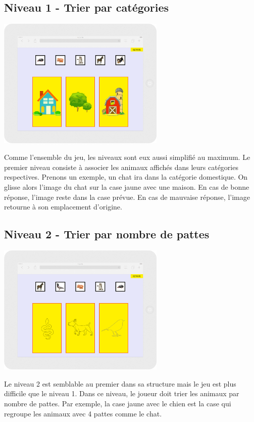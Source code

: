 \documentclass{article}
\begin{document}
\subsection{Niveau 1 - Trier par cat\'egories}
\vspace{0.5cm}
\begin{center}
\includegraphics[width=0.6\textwidth]{page2}
\end{center}
\vspace{0.5cm}
\hspace*{0.6cm}Comme l'ensemble du jeu, les niveaux sont eux aussi simplifi\'e au maximum.
Le premier niveau consiste \`a associer les animaux affich\'es dans leurs cat\'egories respectives. Prenons un exemple, un chat ira dans la cat\'egorie domestique. On glisse alors l'image du chat sur la case jaune avec une maison. En cas de bonne r\'eponse, l'image reste dans la case pr\'evue. En cas de mauvaise r\'eponse, l'image retourne \`a son emplacement d'origine.
\subsection{Niveau 2 - Trier par nombre de pattes}
\vspace{0.5cm}
\begin{center}
\includegraphics[width=0.6\textwidth]{page3}
\end{center}
\vspace{0.5cm}
\hspace*{0.6cm}Le niveau 2 est semblable au premier dans sa structure mais le jeu est plus difficile que le niveau 1. Dans ce niveau, le joueur doit trier les animaux par nombre de pattes. Par exemple, la case jaune avec le chien est la case qui regroupe les animaux avec 4 pattes comme le chat.
\end{document}
